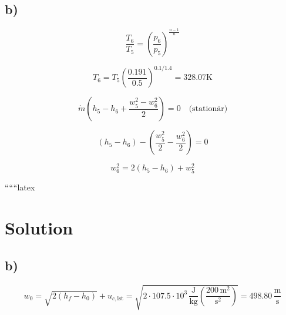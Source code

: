 

\subsection*{b)}

\[
\frac{T_6}{T_5} = \left( \frac{p_6}{p_5} \right)^{\frac{n-1}{n}}
\]

\[
T_6 = T_5 \left( \frac{0.191}{0.5} \right)^{0.1/1.4} = 328.07 \text{K}
\]

\[
\dot{m} \left( h_5 - h_6 + \frac{w_5^2 - w_6^2}{2} \right) = 0 \quad \text{(stationär)}
\]

\[
\left( h_5 - h_6 \right) - \left( \frac{w_5^2}{2} - \frac{w_6^2}{2} \right) = 0
\]

\[
w_6^2 = 2 \left( h_5 - h_6 \right) + w_5^2
\]

``````latex


\section*{Solution}



\subsection*{b)}

\[
w_0 = \sqrt{2(h_f - h_0)} + u_{c, \text{ist}} = \sqrt{2 \cdot 107.5 \cdot 10^3 \, \frac{\text{J}}{\text{kg}} \left( \frac{200 \, \text{m}^2}{\text{s}^2} \right)} = 498.80 \, \frac{\text{m}}{\text{s}}
\]